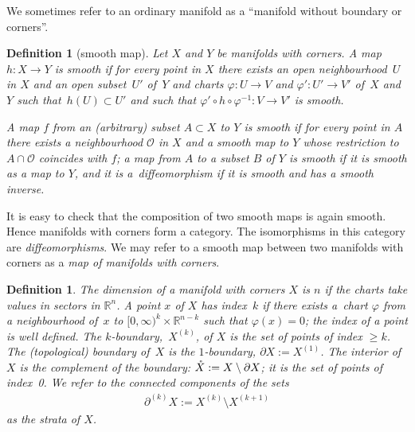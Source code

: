 \documentclass[10pt,a4paper]{amsart}
\numberwithin{equation}{section}
\newtheorem{Definition}[Lemma]{Definition}
\begin{document}
We sometimes refer to an ordinary manifold as a ``manifold
without boundary or corners''.

\begin{Definition}[smooth map]
Let $X$ and $Y$ be manifolds with corners.
A map $h \colon X \to Y$ is \emph{smooth}
if for every point in $X$ there exists an open neighbourhood~$U$ in $X$
and an open subset~$U'$ of~$Y$
and charts $\varphi \colon U \to V$ and $\varphi' \colon U' \to V'$
of~$X$ and~ $Y$
such that~$h(U) \subset U'$
and such that $\varphi' \circ h \circ \varphi^{-1} \colon V \to V'$ is smooth.

A map $f$ from an (arbitrary) subset $A \subset X$ to $Y$ is smooth
if for every point in $A$ there exists a neighbourhood ${\mathcal O}$ in $X$
and a smooth map to $Y$ whose restriction to $A \cap {\mathcal O}$ coincides
with $f$; a map from $A$ to a subset $B$ of $Y$ is smooth if it is smooth
as a map to $Y$, and it is a~\emph{diffeomorphism} if it is smooth and has
a smooth inverse.
\end{Definition}

It is easy to check that the composition of two smooth maps is again smooth.
Hence manifolds with corners form a category.
The isomorphisms in this category are \emph{diffeomorphisms}.
We may refer to a smooth map between two manifolds with corners
as a {\em map of manifolds with corners}.

\begin{Definition} \label{strata} The \emph{dimension} of a manifold
  with corners $X$ is $n$ if the charts take values in sectors in
  ${\mathbb R}^n$.  A point $x$ of $X$ has \emph{index~$k$} if there exists a~chart $\varphi$ from a neighbourhood of~$x$ to $[0,\infty)^k \times
  {\mathbb R}^{n-k}$ such that $\varphi(x) = 0$; the index of a point is well
  def\/ined.  The \emph{$k$-boundary},~$X^{(k)}$, of $X$ is the set of
  points of index $\geq k$.  The (topological) \emph{boundary} of~$X$ is the
  $1$-boundary, $\partial X := X^{(1)}$.  The \emph{interior} of~$X$ is
  the complement of the boundary: ${\mathaccent23{X}} := X \setminus \partial X$; it is
  the set of points of index~0.
We refer to the connected components of the sets
\begin{gather*}
\partial^{(k)}X:= X^{(k)} \setminus X^{(k+1)}
\end{gather*}
 as the \emph{strata} of $X$.
\end{Definition}
\end{document}
